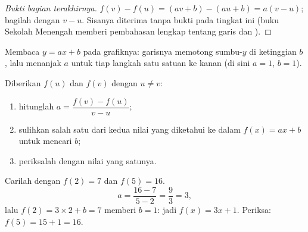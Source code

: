 \begin{proof}[Bukti bagian terakhirnya]
$f(v) - f(u) = (av + b) - (au + b) = a(v - u)$; bagilah dengan
$v - u$. Sisanya diterima tanpa bukti pada tingkat ini (buku Sekolah
Menengah memberi pembahasan lengkap tentang garis dan ).
\end{proof}

\begin{omfigure}

{\small Membaca $y = ax + b$ pada grafiknya: garisnya memotong
sumbu-$y$ di ketinggian $b$, lalu menanjak $a$ untuk tiap langkah satu
satuan ke kanan (di sini $a = 1$, $b = 1$).}
\end{omfigure}

\begin{method}\label{met:g9:linfunc:findaffine}
Diberikan $f(u)$ dan $f(v)$ dengan $u \neq v$:
\begin{enumerate}
  \item hitunglah  $a = \dfrac{f(v) - f(u)}{v - u}$;
  \item sulihkan salah satu dari kedua nilai yang diketahui ke dalam
        $f(x) = ax + b$ untuk mencari $b$;
  \item periksalah dengan nilai yang satunya.
\end{enumerate}
\end{method}

\begin{example}\label{ex:g9:linfunc:findaffine}
Carilah  dengan $f(2) = 7$ dan $f(5) = 16$.
\[
a = \frac{16 - 7}{5 - 2} = \frac93 = 3 ,
\]
lalu $f(2) = 3 \times 2 + b = 7$ memberi $b = 1$: jadi
$f(x) = 3x + 1$. Periksa: $f(5) = 15 + 1 = 16$.
\end{example}

